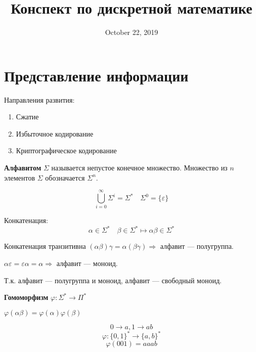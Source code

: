 

\title{Конспект по дискретной математике}

\date{October 22, 2019}


    
\maketitle

\section{Представление информации}

Направления развития:
\begin{enumerate}
    \item Сжатие
    \item Избыточное кодирование
    \item Криптографическое кодирование
\end{enumerate}

\begin{definition}
    \textbf{Алфавитом} $\Sigma$ называется непустое конечное множество. Множество из $n$ элементов $\Sigma$ обозначается $\Sigma^n$.
\end{definition}

$$\bigcup\limits_{i=0}^\infty \Sigma^i=\Sigma^* \quad \Sigma^0=\{\varepsilon\}$$

\begin{definition}
    Конкатенация:
    $$\alpha\in\Sigma^* \quad \beta\in\Sigma^* \mapsto \alpha\beta\in\Sigma^*$$
\end{definition}

Конкатенация транзитивна $(\alpha\beta)\gamma=\alpha(\beta\gamma) \Rightarrow$ алфавит --- полугруппа.

$\alpha\varepsilon=\varepsilon\alpha=\alpha \Rightarrow$ алфавит --- моноид.

Т.к. алфавит --- полугруппа и моноид, алфавит --- свободный моноид.

\begin{definition}
    \textbf{Гомоморфизм} $\varphi: \Sigma^*\to \Pi^*$
    
    $\varphi(\alpha\beta)=\varphi(\alpha)\varphi(\beta)$
\end{definition}

\begin{example}
    $$0\to a, 1\to ab$$
    $$\varphi: \{0,1\}^*\to\{a,b\}^*$$
    $$\varphi(001)=aaab$$
\end{example}

